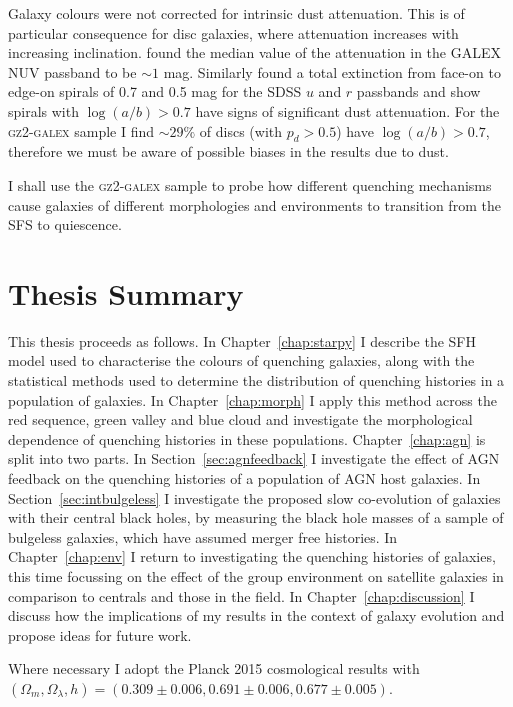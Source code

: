 Galaxy colours were not corrected for intrinsic dust attenuation. This is of particular consequence for disc galaxies, where attenuation increases with increasing inclination. \cite{Buat05} found the median value of the attenuation in the GALEX NUV passband to be $\sim 1$ mag. Similarly \cite{masters10a} found a total extinction from face-on to edge-on spirals of 0.7 and 0.5 mag for the SDSS $u$ and $r$ passbands and show spirals with $\log(a/b) > 0.7$ have signs of significant dust attenuation. For the \textsc{gz2-galex} sample I find $\sim29\%$ of discs (with $p_d > 0.5$) have $\log(a/b) > 0.7$, therefore we must be aware of possible biases in the results due to dust. 

I shall use the \textsc{gz2-galex} sample to probe how different quenching mechanisms cause galaxies of different morphologies and environments to transition from the SFS to quiescence. 


\section{Thesis Summary}\label{sec:thesissum}


This thesis proceeds as follows. In Chapter~\ref{chap:starpy} I describe the SFH model used to characterise the colours of quenching galaxies, along with the statistical methods used to determine the distribution of quenching histories in a population of galaxies. In Chapter~\ref{chap:morph} I apply this method across the red sequence, green valley and blue cloud and investigate the morphological dependence of quenching histories in these populations. Chapter~\ref{chap:agn} is split into two parts. In Section~\ref{sec:agnfeedback} I investigate the effect of AGN feedback on the quenching histories of a  population of AGN host galaxies. In Section~\ref{sec:intbulgeless} I investigate the proposed slow co-evolution of galaxies with their central black holes, by measuring the black hole masses of a sample of bulgeless galaxies, which have assumed merger free histories. In Chapter~\ref{chap:env} I return to investigating the quenching histories of galaxies, this time focussing on the effect of the group environment on satellite galaxies in comparison to centrals and those in the field. In Chapter~\ref{chap:discussion} I discuss how the implications of my results in the context of galaxy evolution and propose ideas for future work.

Where necessary I adopt the Planck 2015 cosmological results \citep{planck16} with $(\Omega_m, \Omega_{\lambda}, h) = (0.309 \pm 0.006, 0.691 \pm 0.006, 0.677 \pm 0.005)$. 
